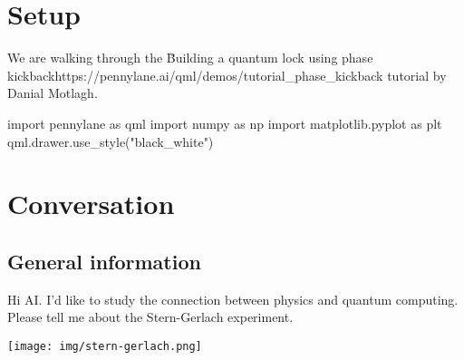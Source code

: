 \section{Setup}

We are walking through the
\u{Building a quantum lock using phase kickback}{https://pennylane.ai/qml/demos/tutorial_phase_kickback}
tutorial by Danial Motlagh.

\begin{python}
import pennylane as qml
import numpy as np
import matplotlib.pyplot as plt
qml.drawer.use_style("black_white")
\end{python}

\begin{result}

\end{result}


\section{Conversation}

\subsection{General information}

\begin{ai}
Hi AI. I'd like to study the connection between physics and quantum computing. Please tell me about
the Stern-Gerlach experiment.
\end{ai}

\begin{center}
\texttt{[image: img/stern-gerlach.png]}
\end{center}

